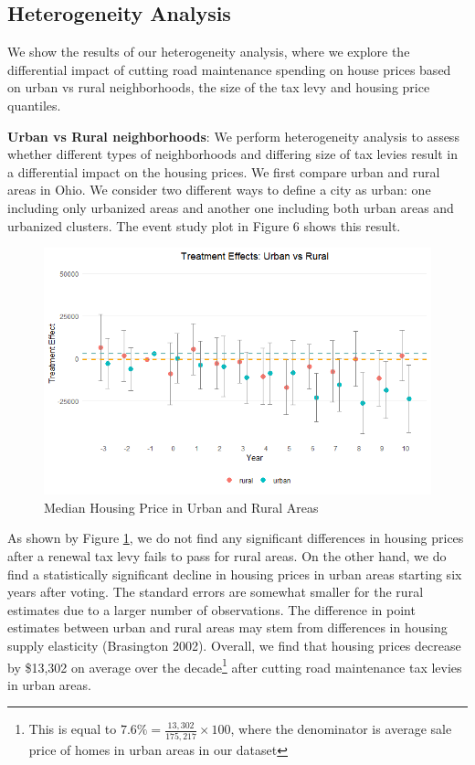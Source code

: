 \subsection{Heterogeneity Analysis} 

We show the results of our heterogeneity analysis, where we explore the differential impact of cutting road maintenance spending on house prices based on urban vs rural neighborhoods, the size of the tax levy and housing price quantiles.

\vskip 0.5cm

\textbf{Urban vs Rural neighborhoods}: We perform heterogeneity analysis to assess whether different types of neighborhoods and differing size of tax levies result in a differential impact on the housing prices. We first compare urban and rural areas in Ohio. We consider two different ways to define a city as urban:  one including only urbanized areas and another one including both urban areas and urbanized clusters. The event study plot in Figure 6 shows this result. 

\begin{figure}[htbp]
    \centering
    \includegraphics[width=\textwidth,keepaspectratio]{images/tes_covs_ua_reg.png}        
    \caption{Median Housing Price in Urban and Rural Areas}
    \label{fig:tes_covs_ua}
\end{figure}

As shown by Figure \ref{fig:tes_covs_ua}, we do not find any significant differences in housing prices after a renewal tax levy fails to pass for rural areas. On the other hand, we do find a statistically significant decline in housing prices in urban areas starting six years after voting. The standard errors are somewhat smaller for the rural estimates due to a larger number of observations. The difference in point estimates between urban and rural areas may stem from differences in housing supply elasticity (Brasington 2002). Overall, we find that housing prices decrease by \$13,302 on average over the decade\footnote{This is equal to $7.6\% = \frac{13,302}{175,217} \times 100$, where the denominator is average sale price of homes in urban areas in our dataset} after cutting road maintenance tax levies in urban areas. 

